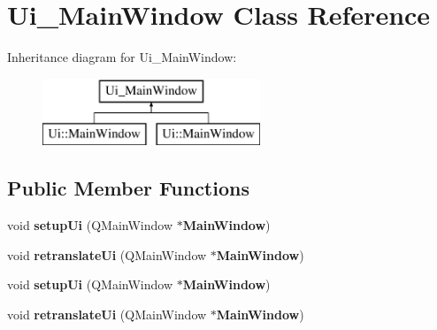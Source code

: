 \section{Ui\-\_\-\-Main\-Window Class Reference}
\label{class_ui___main_window}
Inheritance diagram for Ui\-\_\-\-Main\-Window\-:\begin{figure}[H]
\begin{center}
\leavevmode
\includegraphics[height=2.000000cm]{class_ui___main_window}
\end{center}
\end{figure}
\subsection*{Public Member Functions}
\begin{DoxyCompactItemize}
\item 
void {\bfseries setup\-Ui} (Q\-Main\-Window $\ast${\bf Main\-Window})\label{class_ui___main_window_acf4a0872c4c77d8f43a2ec66ed849b58}

\item 
void {\bfseries retranslate\-Ui} (Q\-Main\-Window $\ast${\bf Main\-Window})\label{class_ui___main_window_a097dd160c3534a204904cb374412c618}

\item 
void {\bfseries setup\-Ui} (Q\-Main\-Window $\ast${\bf Main\-Window})\label{class_ui___main_window_acf4a0872c4c77d8f43a2ec66ed849b58}

\item 
void {\bfseries retranslate\-Ui} (Q\-Main\-Window $\ast${\bf Main\-Window})\label{class_ui___main_window_a097dd160c3534a204904cb374412c618}

\end{DoxyCompactItemize}
